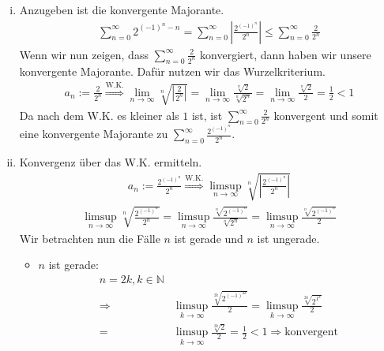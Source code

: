 \documentclass{scrartcl}
\begin{document}
	\begin{enumerate}[(i)]
		\item Anzugeben ist die konvergente Majorante.
				\begin{align*}
					\sum^{\infty}_{n=0} 2^{(-1)^n - n} = \sum^{\infty}_{n=0} \left|\frac{2^{(-1)^n}}{2^n}\right| \leq \sum^{\infty}_{n=0} \frac{2}{2^n}
				\end{align*}
				Wenn wir nun zeigen, dass $\sum^{\infty}_{n=0} \frac{2}{2^n}$ konvergiert, dann haben wir unsere konvergente Majorante. Dafür nutzen wir das Wurzelkriterium.
				\begin{align*}
					a_n:=\frac{2}{2^n} \overset{\text{W.K.}}{\Longrightarrow} \lim_{n \to \infty}\sqrt[n]{\left|\frac{2}{2^n}\right|} = \lim_{n \to \infty}\frac{\sqrt[n]{2}}{\sqrt[n]{2^n}} = \lim_{n \to \infty}\frac{\sqrt[n]{2}}{2} = \frac{1}{2} < 1
				\end{align*}
				Da nach dem W.K. es kleiner als $1$ ist, ist $\sum^{\infty}_{n=0} \frac{2}{2^n}$ konvergent und somit eine konvergente Majorante zu $\sum^{\infty}_{n=0} \frac{2^{(-1)^n}}{2^n}$.
		\item	Konvergenz über das W.K. ermitteln.
				\begin{align*}
					a_n:= \frac{2^{(-1)^n}}{2^n} \overset{\text{W.K.}}{\Longrightarrow} \limsup_{n \to \infty}\sqrt[n]{\left|\frac{2^{(-1)^n}}{2^n}\right|}
				\end{align*}
				\begin{align*}
					\limsup_{n \to \infty}\sqrt[n]{\frac{2^{(-1)^n}}{2^n}} = \limsup_{n \to \infty}\frac{\sqrt[n]{2^{(-1)^n}}}{\sqrt[n]{2^n}} = \limsup_{n \to \infty}\frac{\sqrt[n]{2^{(-1)^n}}}{2}
				\end{align*}
				Wir betrachten nun die Fälle $n$ ist gerade und $n$ ist ungerade.
				\begin{itemize}
				\item $n$ ist gerade:
						\begin{align*}
							n = 2k ,k\in \mathbb{N} \\
							\Rightarrow &\limsup_{k \to \infty}\frac{\sqrt[2k]{2^{(-1)^{2k}}}}{2} = \limsup_{k \to \infty}\frac{\sqrt[2k]{2^{1^k}}}{2} \\
							= &\limsup_{k \to \infty}\frac{\sqrt[2k]{2}}{2} = \frac{1}{2} < 1 \Rightarrow \text{konvergent}
						\end{align*}
						

\end{itemize}
\end{enumerate}
\end{document}
